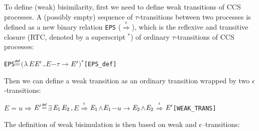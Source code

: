 \documentclass[GCNS]{yincog}
\renewcommand{\HOLinline}[1]{\mbox{\textup{\texttt{#1}}}}
\renewcommand{\HOLConst}[1]{\texttt{#1}}
\renewcommand{\HOLBoundVar}[1]{\ensuremath{\mathit{#1}}}
\renewcommand{\HOLFreeVar}[1]{\ensuremath{\mathit{#1}}}
\renewcommand{\HOLSymConst}[1]{#1}
\renewcommand{\HOLTokenConj}{\ensuremath{\wedge}}
\renewcommand{\HOLTokenDefEquality}{\ensuremath{\mathrel{\overset{\makebox [0pt]{\text{\tiny \textsf{def}}}}{=}}}}
\renewcommand{\HOLTokenExists}{\ensuremath{\exists \,}}
\renewcommand{\HOLTokenLambda}{\ensuremath{\lambda \,}}
\renewcommand{\HOLTokenSupStar}{\ensuremath{{}^{*}}}
\theoremstyle{remark}
\theoremstyle{theorem}
\theoremstyle{remark}
\newcommand{\HOLTokenEPS}{$\overset{\epsilon}{\Longrightarrow}$}
\newcommand{\HOLTokenTransBegin}{$-$}
\newcommand{\HOLTokenTransEnd}{$\rightarrow$\xspace}
\newcommand{\HOLTokenWeakTransBegin}{$=$}
\newcommand{\HOLTokenWeakTransEnd}{$\Rightarrow$\xspace}
\begin{document}
To define (weak) bisimilarity, first we need to define weak transitions
of CCS processes. A (possibly empty) sequence of $\tau $-transitions between
two processes is defined as a new binary relation
\HOLinline{\HOLConst{EPS}} ($\overset{\epsilon}{\Longrightarrow}$), which
is the reflexive and transitive closure (RTC, denoted by a superscript
$^{*}$) of ordinary $\tau $-transitions of CCS processes:
%
\begin{alltt}
   \HOLConst{EPS} \HOLTokenDefEquality{} \ensuremath{(}\HOLTokenLambda{}\HOLBoundVar{E} \ensuremath{\HOLBoundVar{E}\sp{\prime}}. \HOLBoundVar{E} \HOLTokenTransBegin\HOLSymConst{\ensuremath{\tau}}\HOLTokenTransEnd \ensuremath{\HOLBoundVar{E}\sp{\prime}}\ensuremath{)}\HOLSymConst{\HOLTokenSupStar{}}\hfill{[EPS\_def]}
\end{alltt}
%
Then we can define a weak transition as an ordinary transition wrapped
by two $\epsilon $-transitions:
%
\begin{alltt}
   \HOLFreeVar{E} \HOLTokenWeakTransBegin\HOLFreeVar{u}\HOLTokenWeakTransEnd \ensuremath{\HOLFreeVar{E}\sp{\prime}} \HOLTokenDefEquality{} \HOLSymConst{\HOLTokenExists{}}\ensuremath{\HOLBoundVar{E}\sb{\mathrm{1}}} \ensuremath{\HOLBoundVar{E}\sb{\mathrm{2}}}. \HOLFreeVar{E} \HOLSymConst{\HOLTokenEPS} \ensuremath{\HOLBoundVar{E}\sb{\mathrm{1}}} \HOLSymConst{\HOLTokenConj{}} \ensuremath{\HOLBoundVar{E}\sb{\mathrm{1}}} \HOLTokenTransBegin\HOLFreeVar{u}\HOLTokenTransEnd \ensuremath{\HOLBoundVar{E}\sb{\mathrm{2}}} \HOLSymConst{\HOLTokenConj{}} \ensuremath{\HOLBoundVar{E}\sb{\mathrm{2}}} \HOLSymConst{\HOLTokenEPS} \ensuremath{\HOLFreeVar{E}\sp{\prime}}\hfill{[WEAK\_TRANS]}
\end{alltt}
%
The definition of weak bisimulation is then based on weak and
$\epsilon $--transitions:
%
\end{document}
